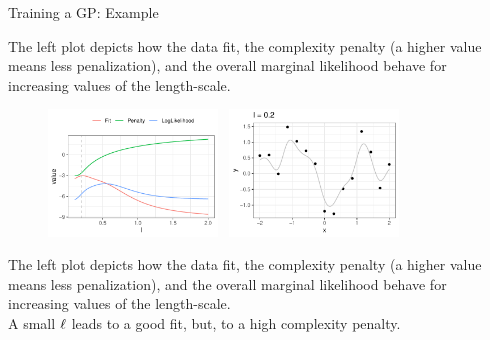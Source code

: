 \begin{frame}[c,allowframebreaks]{Training a GP: Example}
\begin{footnotesize}
\textcolor{blue}{\faInfoCircle} The left plot depicts how the data fit, the complexity penalty (a higher value means less penalization), and the overall marginal likelihood behave for increasing values of the length-scale.
\end{footnotesize}


\framebreak


\begin{figure}
	\includegraphics[width = 0.4\textwidth]{figure_man/training/fit-vs-penalty-0_2.pdf}~	\includegraphics[width = 0.4\textwidth]{figure_man/training/datapoints-0_2.pdf}
\end{figure}


\begin{footnotesize}
\textcolor{blue}{\faInfoCircle} The left plot depicts how the data fit, the complexity penalty (a higher value means less penalization), and the overall marginal likelihood behave for increasing values of the length-scale.\\
\vspace{3mm}
\textcolor{blue}{\faLightbulbO} A small $\ell$ leads to a good fit, but, to a high complexity penalty.
\end{footnotesize}




\framebreak


\end{frame}
